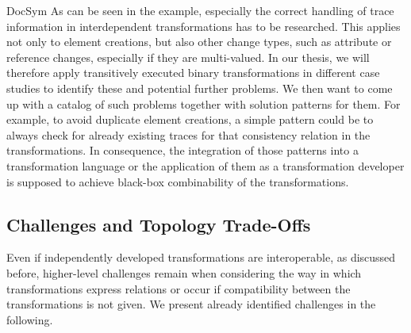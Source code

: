\begin{copiedFrom}{DocSym}
As can be seen in the example, especially the correct handling of trace information in interdependent transformations has to be researched.
This applies not only to element creations, but also other change types, such as attribute or reference changes, especially if they are multi-valued.
In our thesis, we will therefore apply transitively executed binary transformations in different case studies to identify these and potential further problems.
We then want to come up with a catalog of such problems %
together with solution patterns for them.
For example, to avoid duplicate element creations, a simple pattern could be to always check for already existing traces for that consistency relation in the transformations.
In consequence, the integration of those patterns into a transformation language or the application of them as a transformation developer is supposed to achieve black-box combinability of the transformations.

\subsection{Challenges and Topology Trade-Offs}
\label{sec:approach:challenges}

Even if independently developed transformations are interoperable, as discussed before, higher-level challenges remain when considering the way in which transformations express relations or occur if compatibility between the transformations is not given.
We present already identified challenges in the following. %


\end{copiedFrom}
